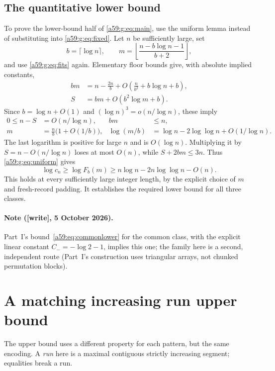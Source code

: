 \documentclass[11pt,letterpaper]{article}
\theoremstyle{remark}\newtheorem{remark}[theorem]{Remark}
\newcommand{\wtag}{\textup{[write]}}
\theoremstyle{remark}\newtheorem{wremark}{Remark}\renewcommand{\thewremark}{W\arabic{wremark}}
\theoremstyle{plain}\newtheorem{wcorollary}[wremark]{Corollary}
\begin{document}
\subsection{The quantitative lower bound}\label{a59:g:sub:quant}
To prove the lower-bound half of \eqref{a59:g:eq:main}, use the uniform lemma instead of substituting into \eqref{a59:g:eq:fixed}. Let $n$ be sufficiently large, set
\[
 b=\lceil\log n\rceil,
 \qquad m=\left\lfloor\frac{n-b\log n-1}{b+2}\right\rfloor,
\]
and use \eqref{a59:g:eq:fits} again. Elementary floor bounds give, with absolute implied constants,
\begin{align}
 bm&=n-\frac{2n}{b}+O\!\left(\frac{n}{b^2}+b\log n+b\right),\label{a59:g:eq:bm}\\
 S&=bm+O(b^2\log m+b).
\end{align}
Since $b=\log n+O(1)$ and $(\log n)^3=o(n/\log n)$, these imply
\begin{align}
 0\leq n-S&=O(n/\log n), & bm&\leq n,\label{a59:g:eq:Sclose}\\
 m&=\frac nb\bigl(1+O(1/b)\bigr), &
 \log(m/b)&=\log n-2\log\log n+O(1/\log n).\label{a59:g:eq:logmb}
\end{align}
The last logarithm is positive for large $n$ and is $O(\log n)$. Multiplying it by $S=n-O(n/\log n)$ loses at most $O(n)$, while $S+2bm\leq3n$. Thus \eqref{a59:g:eq:uniform} gives
\[
 \log c_n\geq\log F_b(m)
 \geq n\log n-2n\log\log n-O(n).
\]
This holds at every sufficiently large integer length, by the explicit choice of $m$ and fresh-record padding. It establishes the required lower bound for all three classes.

\paragraph{Note (\wtag, 5 October 2026).} Part~I's
bound~\eqref{a59:eq:commonlower} for the common class, with the explicit
linear constant $C_-=-\log2-1$, implies this one; the family here is a
second, independent route (Part~I's construction uses triangular arrays,
not chunked permutation blocks).
\section{A matching increasing run upper bound}\label{a59:g:sec:upper}
The upper bound uses a different property for each pattern, but the same encoding. A \emph{run} here is a maximal contiguous strictly increasing segment; equalities break a run.
\end{document}
